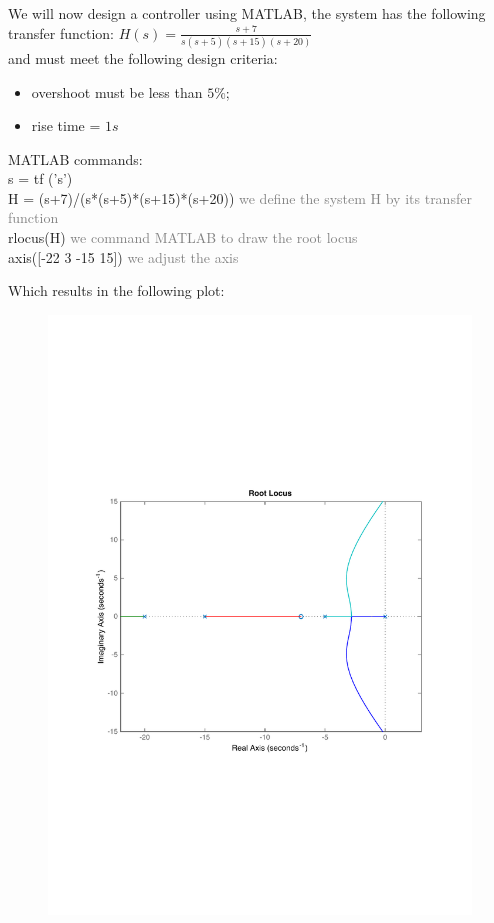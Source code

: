 \begin{frame}
	\begin{example}
		We will now design a controller using MATLAB, the system has the following transfer function: $H(s) = \frac{s+7}{s(s+5)(s+15)(s+20)}$\\
		and must meet the following design criteria: 
		\begin{itemize}
			\item overshoot must be less than $5\%$;
			\item rise time = $1s$
		\end{itemize}
		MATLAB commands:\\
		s = tf ('s') \\
		H = (s+7)/(s*(s+5)*(s+15)*(s+20)) \textcolor{gray}{we define the system H by its transfer function} \\
		rlocus(H) \textcolor{gray}{we command MATLAB to draw the root locus} \\
		axis([-22 3 -15 15])	\textcolor{gray}{we adjust the axis} \\
	\end{example}
\end{frame}

\begin{frame}
	\begin{exampleblock}{}
		Which results in the following plot:
		\vspace{-0.5em}
		\begin{figure}
			\centering
			\includegraphics[width=0.7\linewidth]{matlab_ex1}
		\end{figure}
	\end{exampleblock}
\end{frame}

